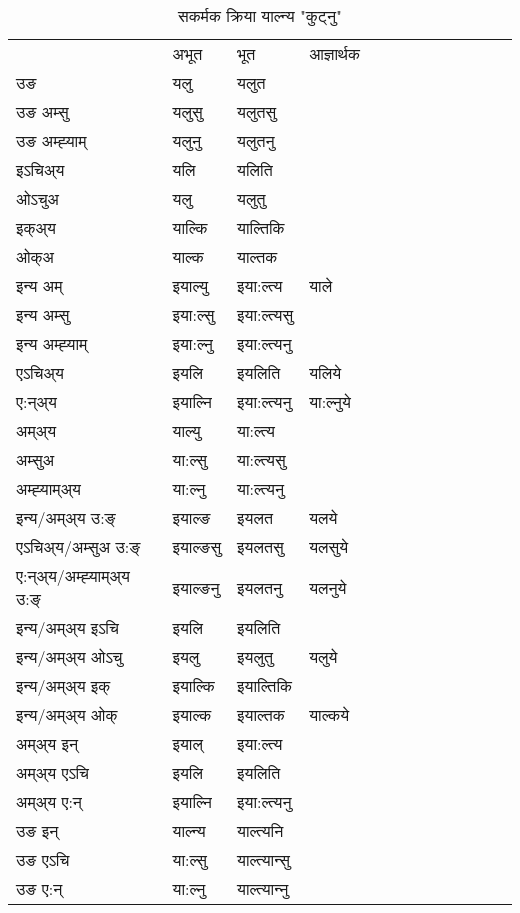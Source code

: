 \begin{table}[H]
\centering
\caption{\label{al.vt} सकर्मक क्रिया  याल्न्य  "कुट्नु"  }
\begin{tabular}{l|l|l|l|l|l|l|l|l|l|l|l|l}  \toprule
&अभूत & भूत & आज्ञार्थक \\ 
उङ &यलु &यलुत \\ 
उङ अम्सु &यलुसु &यलुतसु \\ 
उङ अम्ह्‍याम् &यलुनु &यलुतनु \\ 
इऽचिअ्य &यलि &यलिति   \\ 
ओऽचुअ &यलु &यलुतु   \\ 
इक्अ्य &याल्कि &याल्तिकि   \\ 
ओक्अ &याल्क &याल्तक   \\ 
इन्य अम् & इयाल्यु  & इया:ल्त्य &याले  \\ 
इन्य अम्सु & इया:ल्सु  & इया:ल्त्यसु   \\ 
इन्य अम्ह्‍याम् & इया:ल्नु  & इया:ल्त्यनु   \\ 
एऽचिअ्य & इयलि & इयलिति &यलिये    \\ 
ए:न्अ्य & इयाल्नि  & इया:ल्त्यनु &या:ल्नुये  \\ 
अम्अ्य & याल्यु  & या:ल्त्य  \\ 
अम्सुअ & या:ल्सु & या:ल्त्यसु  \\ 
अम्ह्‍याम्अ्य & या:ल्नु  & या:ल्त्यनु \\ 
\midrule
इन्य/अम्अ्य उ:ङ्‌&इयाल्ङ & इयलत &यलये \\ 
एऽचिअ्य/अम्सुअ उ:ङ्‌ &इयाल्ङसु & इयलतसु &यलसुये \\ 
ए:न्अ्य/अम्ह्‍याम्अ्य उ:ङ्‌ &इयाल्ङनु & इयलतनु &यलनुये \\ 
इन्य/अम्अ्य इऽचि & इयलि & इयलिति    \\ 
इन्य/अम्अ्य ओऽचु & इयलु & इयलुतु  &यलुये  \\ 
इन्य/अम्अ्य इक् & इयाल्कि & इयाल्तिकि   \\ 
इन्य/अम्अ्य ओक् & इयाल्क & इयाल्तक  &याल्कये  \\ 
अम्अ्य इन् & इयाल् & इया:ल्त्य   \\ 
अम्अ्य एऽचि & इयलि & इयलिति    \\ 
अम्अ्य ए:न् & इयाल्नि  & इया:ल्त्यनु  \\ 
\midrule
उङ इन् & याल्न्य  & याल्त्यनि  \\ 
उङ एऽचि & या:ल्सु  & याल्त्यान्सु   \\ 
उङ ए:न्& या:ल्नु  & याल्त्यान्‍नु   \\ 
\bottomrule
\end{tabular}
\end{table}


